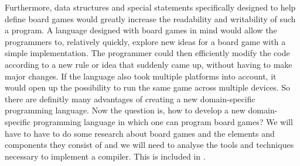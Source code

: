 Furthermore, data structures and special statements specifically designed to
help define board games would greatly increase the readability and writability
of such a program. A language designed with board games in mind would allow the
programmers to, relatively quickly, explore new ideas for a board game with a
simple implementation. The programmer could then efficiently modify the code
according to a new rule or idea that suddenly came up, without having to make
major changes. If the language also took multiple platforms into account, it
would open up the possibility to run the same game across multiple devices. So
there are definitly many advantages of creating a new domain-specific
programming language. Now the question is, how to develop a new domain-specific
programming language in which one can program board games? We will have to have
to do some research about board games and the elements and components they
consist of and we will need to analyse the tools and techniques necessary to
implement a compiler. This is included in .
